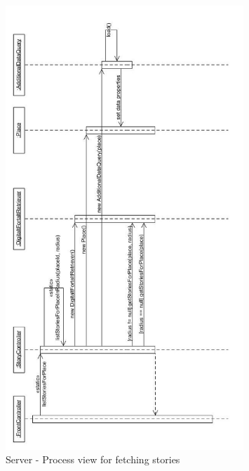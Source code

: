 \documentclass[11pt]{book}
\begin{document}
\begin{figure}[H]
      \centering
      \includegraphics[width=0.8\textwidth]{Figures/Architecture/Sequence/story.jpg}
      \caption{Server - Process view for fetching stories}
      \label{fig:arch_server_process_story}
\end{figure}
\end{document}
